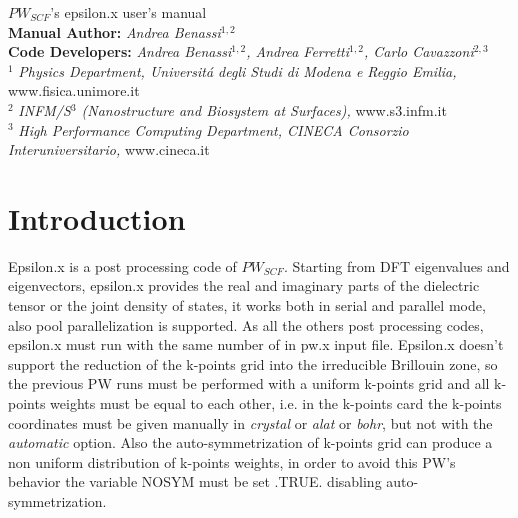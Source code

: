 \documentclass[twocolumn]{article}
\begin{document}
\begin{titlepage}
\Huge
\begin{center}
$PW_{SCF}$'s epsilon.x user's manual\\[4.5cm]
\normalsize
\vspace{10.5cm}
\textbf{Manual Author:}
\emph{Andrea Benassi}$^{1,2}$\\[0.3cm]
\textbf{Code Developers:}
\emph{Andrea Benassi$^{1,2}$, Andrea Ferretti$^{1,2}$, Carlo Cavazzoni$^{2,3}$}\\[1cm]
$^{1}$ \emph{Physics Department, Universit\'a degli Studi di Modena e Reggio Emilia,} www.fisica.unimore.it\\
$^{2}$ \emph{INFM/S$^{3}$ (Nanostructure and Biosystem at Surfaces),} www.s3.infm.it\\
$^{3}$ \emph{High Performance Computing Department, CINECA Consorzio Interuniversitario,} www.cineca.it\\
\end{center}
\end{titlepage}
\newpage
\section{Introduction}
Epsilon.x is a post processing code of $PW_{SCF}$. Starting from DFT eigenvalues and eigenvectors,
epsilon.x provides the real and imaginary parts of the dielectric tensor or the joint density of states, it works both in serial and
parallel mode, also pool parallelization is supported. As all the others post processing codes, epsilon.x must run with the same number of
in pw.x input file.   
Epsilon.x doesn't support the reduction of the k-points grid into the irreducible Brillouin zone, so the previous PW runs must be
performed with a uniform k-points grid and all k-points weights must be equal to each other, i.e. in the k-points card the k-points
coordinates must be given manually in \emph{crystal} or \emph{alat} or \emph{bohr}, but not with the \emph{automatic} option. Also the
auto-symmetrization of k-points grid can produce a non uniform distribution of k-points weights, in order to avoid this
PW's behavior the variable NOSYM must be set .TRUE. disabling auto-symmetrization.
\end{document}
